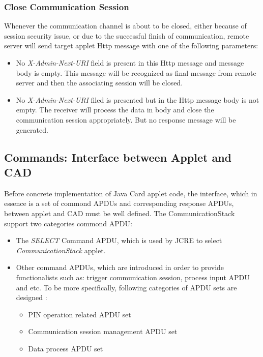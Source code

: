 \subsubsection{Close Communication Session}
Whenever the communication channel is about to be closed, either because of session security issue, or due to the successful finish of communication, remote server will send target applet Http message with one of the following parameters:
 \begin{itemize}
  \item No \emph{X-Admin-Next-URI} field is present in this Http message and message body is empty. This message will be recognized as final message from remote server and then the associating session will be closed.
  \item No \emph{X-Admin-Next-URI} filed is presented but in the Http message body is not empty. The receiver will process the data in body and close the communication session appropriately. But no response message will be generated.
\end{itemize}

\subsection {Commands: Interface between Applet and CAD} \label{secAPDU}
Before concrete implementation of Java Card applet code, the interface, which in essence is a set of commond APDUs and corresponding response APDUs, between applet and CAD must be well defined.  The CommunicationStack support two categories commond APDU:
 \begin{itemize}
  \item The \emph{SELECT} Command APDU, which is used by JCRE to select \emph{CommunicationStack} applet.
  \item Other command APDUs, which are introduced in order to provide functionalists such as: trigger communication session, process input APDU and etc. To be more specifically, following categories of APDU sets are designed :
\begin{itemize}
  \item PIN operation related APDU set
  \item Communication session management APDU set
  \item Data process APDU set
\end{itemize}
\end{itemize}

